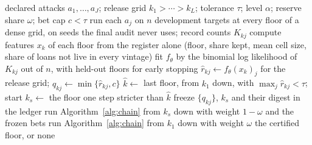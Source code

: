 \begin{algorithm}[t]
\caption{The neural release pipeline}\label{alg:neural}
\begin{algorithmic}[1]
\Require declared attacks $a_1,\ldots,a_J$; release grid $k_1>\cdots>k_L$; tolerance
  $\tau$; level $\alpha$; reserve share $\omega$; bet cap $c<\tau$
\State run each $a_j$ on $n$ development targets at every floor of a dense grid, on
  seeds the final audit never uses; record counts $K_{kj}$ 
\State compute features $x_k$ of each floor from the register alone (floor, share
  kept, mean cell size, share of loans not live in every vintage)
\State fit $f_\theta$ by the binomial log likelihood of $K_{kj}$ out of $n$, with
  held-out floors for early stopping 
\State $\hat r_{kj}\gets f_\theta(x_{k})_j$ for the release grid; $q_{kj}\gets\min\{\hat r_{kj},c\}$
\State $\hat k\gets$ last floor, from $k_1$ down, with $\max_j\hat r_{kj}<\tau$; start
  $k_s\gets$ the floor one step stricter than $\hat k$
\State freeze $\{q_{kj}\}$, $k_s$ and their digest in the ledger 
\State run Algorithm~\ref{alg:chain} from $k_s$ down with weight $1-\omega$ and the frozen
  bets 
  \State run Algorithm~\ref{alg:chain} from $k_1$ down with weight $\omega$
\EndIf
\State \Return the certified floor, or none
\end{algorithmic}
\end{algorithm}
